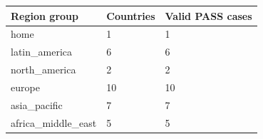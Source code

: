 \begin{tabularx}{\linewidth}{@{}XXX@{}}
\toprule
Region group & Countries & Valid PASS cases \\
\midrule
home & 1 & 1 \\
latin\_america & 6 & 6 \\
north\_america & 2 & 2 \\
europe & 10 & 10 \\
asia\_pacific & 7 & 7 \\
africa\_middle\_east & 5 & 5 \\
\bottomrule
\end{tabularx}

